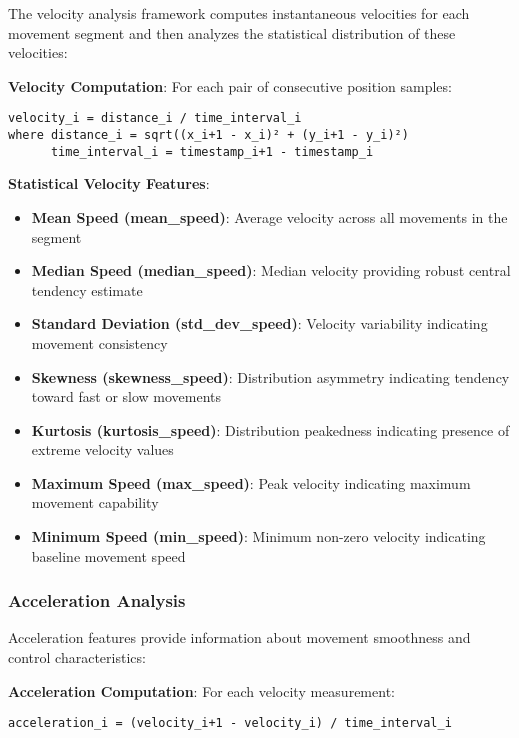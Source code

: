\documentclass[
  12pt,
  a4paper,
]{report}
\providecommand{\tightlist}{%
  \setlength{\itemsep}{0pt}\setlength{\parskip}{0pt}}
\begin{document}
The velocity analysis framework computes instantaneous velocities for
each movement segment and then analyzes the statistical distribution of
these velocities:

\textbf{Velocity Computation}: For each pair of consecutive position
samples:

\begin{verbatim}
velocity_i = distance_i / time_interval_i
where distance_i = sqrt((x_i+1 - x_i)² + (y_i+1 - y_i)²)
      time_interval_i = timestamp_i+1 - timestamp_i
\end{verbatim}

\textbf{Statistical Velocity Features}:

\begin{itemize}
\tightlist
\item
  \textbf{Mean Speed (mean\_speed)}: Average velocity across all
  movements in the segment
\item
  \textbf{Median Speed (median\_speed)}: Median velocity providing
  robust central tendency estimate
\item
  \textbf{Standard Deviation (std\_dev\_speed)}: Velocity variability
  indicating movement consistency
\item
  \textbf{Skewness (skewness\_speed)}: Distribution asymmetry indicating
  tendency toward fast or slow movements
\item
  \textbf{Kurtosis (kurtosis\_speed)}: Distribution peakedness
  indicating presence of extreme velocity values
\item
  \textbf{Maximum Speed (max\_speed)}: Peak velocity indicating maximum
  movement capability
\item
  \textbf{Minimum Speed (min\_speed)}: Minimum non-zero velocity
  indicating baseline movement speed
\end{itemize}

\subsubsection{Acceleration Analysis}\label{acceleration-analysis}

Acceleration features provide information about movement smoothness and
control characteristics:

\textbf{Acceleration Computation}: For each velocity measurement:

\begin{verbatim}
acceleration_i = (velocity_i+1 - velocity_i) / time_interval_i
\end{verbatim}
\end{document}
